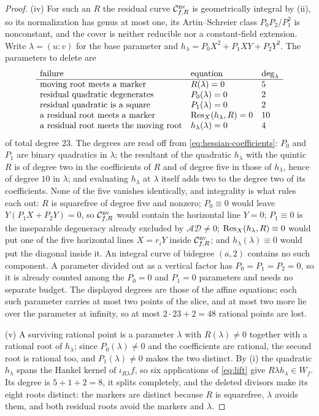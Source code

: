 \begin{proof}
(iv)  For such an $R$ the residual curve $\mathcal C^{\mathrm{nv}}_{f,R}$ is
geometrically integral by (ii), so its normalization has genus at most one,
its Artin--Schreier class $P_0P_2/P_1^2$ is nonconstant, and the cover is
neither reducible nor a constant-field extension.  Write $\lambda=(u:v)$ for
the base parameter and $h_\lambda=P_0X^2+P_1XY+P_2Y^2$.  The parameters to
delete are
\[
\begin{array}{lll}
\text{failure}&\text{equation}&\deg_\lambda\\\hline
\text{moving root meets a marker}&R(\lambda)=0&5\\
\text{residual quadratic degenerates}&P_0(\lambda)=0&2\\
\text{residual quadratic is a square}&P_1(\lambda)=0&2\\
\text{a residual root meets a marker}&\operatorname{Res}_X(h_\lambda,R)=0&10\\
\text{a residual root meets the moving root}&h_\lambda(\lambda)=0&4
\end{array}
\]
of total degree $23$.  The degrees are read off from
\eqref{eq:hessian-coefficients}: $P_0$ and $P_1$ are binary quadratics in
$\lambda$; the resultant of the quadratic $h_\lambda$ with the quintic $R$ is
of degree two in the coefficients of $R$ and of degree five in those of
$h_\lambda$, hence of degree $10$ in $\lambda$; and evaluating $h_\lambda$ at
$\lambda$ itself adds two to the degree two of its coefficients.  None of the
five vanishes identically, and integrality is what rules each out: $R$ is
squarefree of degree five and nonzero; $P_0\equiv0$ would leave
$Y(P_1X+P_2Y)=0$, so $\mathcal C^{\mathrm{nv}}_{f,R}$ would contain the horizontal
line $Y=0$; $P_1\equiv0$ is the inseparable degeneracy already excluded by
$\mathcal{AD}\neq0$; $\operatorname{Res}_X(h_\lambda,R)\equiv0$ would put one of the five
horizontal lines $X=r_iY$ inside $\mathcal C^{\mathrm{nv}}_{f,R}$; and
$h_\lambda(\lambda)\equiv0$
would put the diagonal inside it.  An integral curve of bidegree $(a,2)$
contains no such component.  A parameter divided out as a vertical factor has
$P_0=P_1=P_2=0$, so it is already counted among the $P_0=0$ and $P_1=0$
parameters and needs no separate budget.  The displayed degrees are those of
the affine equations; each such parameter carries at most two points of the
slice, and at most two more lie over the parameter at infinity, so at most
$2\cdot23+2=48$ rational points are lost.

(v)  A surviving rational point is a parameter $\lambda$ with
$R(\lambda)\neq0$ together with a rational root of $h_\lambda$; since
$P_0(\lambda)\neq0$ and the coefficients are rational, the second root is
rational too, and $P_1(\lambda)\neq0$ makes the two distinct.  By (i) the
quadratic $h_\lambda$ spans the Hankel kernel of $\iota_{R\lambda}f$, so six
applications of \eqref{eq:lift} give $R\lambda h_\lambda\in W_f$.  Its degree
is $5+1+2=8$, it
splits completely, and the deleted divisors make its eight roots distinct: the
markers are distinct because $R$ is squarefree, $\lambda$ avoids them, and both
residual roots avoid the markers and $\lambda$.
\end{proof}

